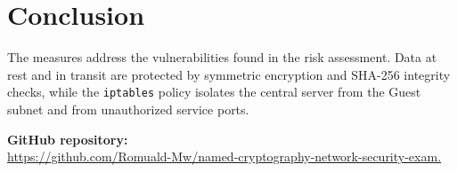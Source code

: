 \documentclass[11pt,a4paper]{article}
\begin{document}
\section{Conclusion}
The measures address the vulnerabilities found in the risk assessment. Data at
rest and in transit are protected by symmetric encryption and SHA-256 integrity
checks, while the \texttt{iptables} policy isolates the central server from the
Guest subnet and from unauthorized service ports.

\vspace{0.5cm}
\noindent\textbf{GitHub repository:} \\
\url{https://github.com/Romuald-Mw/named-cryptography-network-security-exam.}
\end{document}

